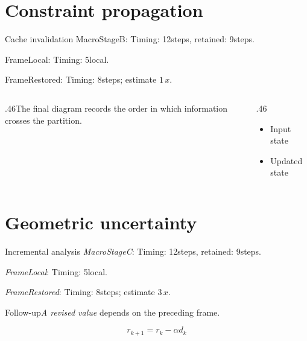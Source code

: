 \documentclass[12pt,aspectratio=169]{beamer}
\newcommand{\fuzzlayerA}[1]{\textrm{#1}}
\newcommand{\fuzzlayerB}[1]{\fuzzlayerA{#1}}
\newcommand{\fuzzlayerC}[1]{\fuzzlayerB{#1}}
\newcommand{\fuzzterm}[1]{\fuzzlayerC{#1}}
\newcommand{\fuzzpair}[2]{\fuzzterm{#1}: #2}
\newcommand{\fuzzunit}{steps}
\let\fuzzoriginalunit\fuzzunit
\newcommand{\fuzzcoefficient}{1}
\newcommand{\fuzzscale}[2][\fuzzcoefficient]{#1\,#2}
\begin{document}
\section{Constraint propagation}
\begin{frame}[t]{Cache invalidation}
\fuzzpair{MacroStageB}{Timing: 12\fuzzunit, retained: 9\fuzzoriginalunit.}\par
{\renewcommand{\fuzzunit}{local}\fuzzpair{FrameLocal}{Timing: 5\fuzzunit.}\par}
\fuzzpair{FrameRestored}{Timing: 8\fuzzunit; estimate $\fuzzscale{x}$.}\par
\begin{columns}[T]\begin{column}{.46\textwidth}The final diagram records the order in which information crosses the partition.\end{column}\begin{column}{.46\textwidth}\begin{itemize}\item Input state\item Updated state\end{itemize}\end{column}\end{columns}
\end{frame}
\renewcommand{\fuzzunit}{steps}
\renewcommand{\fuzzcoefficient}{3}
\renewcommand{\fuzzterm}[1]{{\textit{#1}}}
\section{Geometric uncertainty}
\begin{frame}[t]{Incremental analysis}
\fuzzpair{MacroStageC}{Timing: 12\fuzzunit, retained: 9\fuzzoriginalunit.}\par
{\renewcommand{\fuzzunit}{local}\fuzzpair{FrameLocal}{Timing: 5\fuzzunit.}\par}
\fuzzpair{FrameRestored}{Timing: 8\fuzzunit; estimate $\fuzzscale{x}$.}\par
\begin{block}{Follow-up}\fuzzterm{A revised value} depends on the preceding frame.\end{block}
\[r_{k+1}=r_k-\alpha d_k\]
\end{frame}
\end{document}
